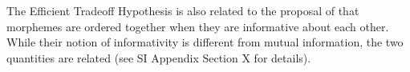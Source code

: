 \documentclass[11pt,letterpaper]{article}
\newcommand{\citep}{\parencite}
\newcommand{\citet}{\Textcite}
\newcommand\mhahn[1]{{\color{red}(#1)}}
\newcounter{def}
\begin{document}

The Efficient Tradeoff Hypothesis is also related to the proposal of \citet{inkelas2016affix} that morphemes are ordered together when they are informative about each other.
While their notion of informativity \citep{priva2017informativity} is different from mutual information, the two quantities are related (see SI Appendix Section X for details).


\end{document}

